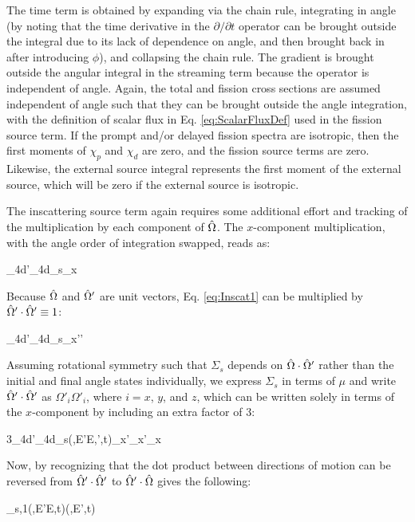 The time term is obtained by expanding via the chain rule, integrating in angle (by noting that the time derivative in the \(\partial/\partial t\) operator can be brought outside the integral due to its lack of dependence on angle, and then brought back in after introducing \(\phi\)), and collapsing the chain rule. The gradient is brought outside the angular integral in the streaming term because the operator is independent of angle. Again, the total and fission cross sections are assumed independent of angle such that they can be brought outside the angle integration, with the definition of scalar flux in Eq. \eqref{eq:ScalarFluxDef} used in the fission source term. If the prompt and/or delayed fission spectra are isotropic, then the first moments of \(\chi_p\) and \(\chi_d\) are zero, and the fission source terms are zero. Likewise, the external source integral represents the first moment of the external source, which will be zero if the external source is isotropic.

The inscattering source term again requires some additional effort and tracking of the multiplication by each component of \(\hat{\Omega}\). The \(x\)-component multiplication, with the angle order of integration swapped, reads as:

\beq
\label{eq:Inscat1}
\int_{4\pi}d\hO'\dEprime \int_{4\pi}d\hO\Sigma_s\seatout\psi\seatelse\Omega_x
\eeq

Because \(\hat{\Omega}\) and \(\hat{\Omega}'\) are unit vectors, Eq. \eqref{eq:Inscat1} can be multiplied by \(\hat{\Omega}'\cdot\hat{\Omega}'\equiv1\):

\beq
\label{sec:Inscat1}
\int_{4\pi}d\hO'\dEprime \int_{4\pi}d\hO\Sigma_s\seatout\psi\seatelse\Omega_x\hO'\cdot\hO'
\eeq

Assuming rotational symmetry such that \(\Sigma_s\) depends on \(\hat{\Omega}\cdot\hat{\Omega}'\) rather than the initial and final angle states individually, we express \(\Sigma_s\) in terms of \(\mu\) and write \(\hat{\Omega}'\cdot\hat{\Omega}'\) as \(\Omega'_i\Omega'_i\), where \(i=x\), \(y\), and \(z\), which can be written solely in terms of the \(x\)-component by including an extra factor of 3:

\beq
\label{sec:Inscat2}
3\int_{4\pi}d\hO'\dEprime \int_{4\pi}d\hO\Sigma_s(,E'\rightarrow E,\hO'\cdot\hO,t)\psi\seatelse\Omega_x\Omega'_x\Omega'_x
\eeq

Now, by recognizing that the dot product between directions of motion can be reversed from \(\hat{\Omega}'\cdot\hat{\Omega}'\) to \(\hat{\Omega}'\cdot\hat{\Omega}\) gives the following:

\beq
\label{eq:Inscat2}
\dEprime \Sigma_{s,1}(,E'\rightarrow E,t)(,E',t)
\eeq

